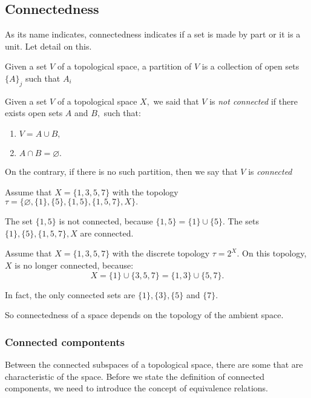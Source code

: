 \documentclass[
	fontsize=10pt, %
	twoside=false, %
	secnumdepth=1, %
]{kaobook}
\begin{document}
\subsection{Connectedness}

As its name indicates, connectedness indicates if a set is made by part or it is a unit. Let detail on this. 

\begin{definition}
Given a set $V$ of a topological space, a partition of $V$ is a collection of open sets $\{A\}_j$ such that $A_i$
\end{definition}

\begin{definition}
Given a set $V$ of a topological space $X,$ we said that $V$ is \emph{not connected} if there exists open sets $A$ and $B,$ such that:
\begin{enumerate}
\item $V=A\cup B,$
\item $A\cap B =\varnothing.$
\end{enumerate}

On the contrary, if there is no such partition, then we say that $V$ is \emph{connected}
\end{definition}

\begin{example}
Assume that $X=\{1,3,5,7\}$ with the topology $\tau=\{\varnothing,\{1\},\{5\},\{1,5\},\{1,5,7\},X\}.$ 

The set $\{1,5\}$ is not connected, because $\{1,5\}=\{1\}\cup\{5\}.$ The sets $\{1\},\{5\},\{1,5,7\}, X$ are connected. 
\end{example}

\begin{example}
Assume that $X=\{1,3,5,7\}$ with the discrete topology $\tau=2^X.$ On this topology, $X$ is no longer connected,  because: $$X=\{1\}\cup\{3,5,7\}=\{1,3\}\cup\{5,7\}.$$

In fact, the only connected sets are $\{1\},\{3\},\{5\}$ and $\{7\}.$
\end{example}

So connectedness of a space depends on the topology of the ambient space. 

\subsubsection{Connected compontents}

Between the connected subspaces of a topological space, there are some that are characteristic of the space. Before we state the definition of connected components, we need to introduce the concept of equivalence relations.
\end{document}
